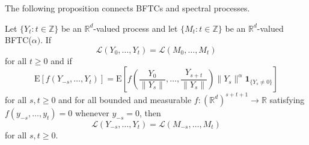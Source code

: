 \documentclass{aptpubarxiv}
\numberwithin{equation}{section}
\begin{document}
The following proposition connects BFTCs and spectral processes. 

\begin{prop}
\label{P:BFTCisspectral}
Let $\{Y_t:t \in \mathbb{Z}\}$ be an $\mathbb{R}^d$-valued process and let $\{M_t:t \in \mathbb{Z}\}$ be an $\mathbb{R}^d$-valued BFTC($\alpha)$. If 
\begin{equation}\label{E:forwardthesame}\mathcal{L}(Y_0, \dots, Y_t)=\mathcal{L}(M_0, \dots, M_t)
\end{equation}
for all $t \geq 0$ and if
\begin{equation}
\label{E:timechange:BFTCspectral}
 {\mathrm{E}}\left[f(Y_{-s}, \ldots, Y_{t}) \right]= {\mathrm{E}}\left[f\left(\frac{Y_0}{\|Y_s\|}, \ldots, \frac{Y_{s+t}}{\|Y_s\|} \right) \|Y_s\|^\alpha{\boldsymbol{1}}_{\{Y_s \neq 0\}} \right]
\end{equation}
for all $s,t \geq 0$ and for all bounded and measurable $f:(\mathbb{R}^d)^{s+t+1} \to \mathbb{R}$ satisfying $f(y_{-s}, \ldots, y_t)=0$ whenever $y_{-s}=0$, then
\begin{equation}\label{E:allthesame} \mathcal{L}(Y_{-s}, \dots, Y_t)=\mathcal{L}(M_{-s}, \dots, M_t)
\end{equation}
for all $s,t \geq 0$. 
\end{prop}
\end{document}
